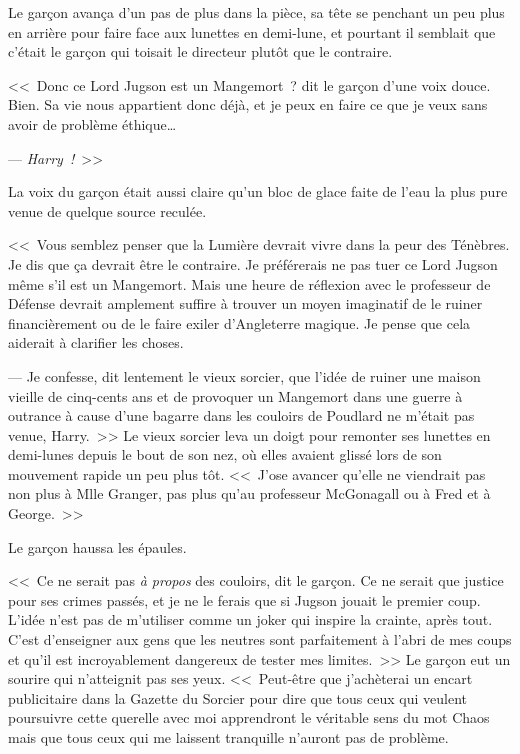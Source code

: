 Le garçon avança d'un pas de plus dans la pièce, sa tête se penchant un peu plus en arrière pour faire face aux lunettes en demi-lune, et pourtant il semblait que c'était le garçon qui toisait le directeur plutôt que le contraire.

<<~Donc ce Lord Jugson est un Mangemort~? dit le garçon d'une voix douce. Bien. Sa vie nous appartient donc déjà, et je peux en faire ce que je veux sans avoir de problème éthique…

--- \emph{Harry~!}~>>

La voix du garçon était aussi claire qu'un bloc de glace faite de l'eau la plus pure venue de quelque source reculée.

<<~Vous semblez penser que la Lumière devrait vivre dans la peur des Ténèbres. Je dis que ça devrait être le contraire. Je préférerais ne pas tuer ce Lord Jugson même s'il est un Mangemort. Mais une heure de réflexion avec le professeur de Défense devrait amplement suffire à trouver un moyen imaginatif de le ruiner financièrement ou de le faire exiler d'Angleterre magique. Je pense que cela aiderait à clarifier les choses.

--- Je confesse, dit lentement le vieux sorcier, que l'idée de ruiner une maison vieille de cinq-cents ans et de provoquer un Mangemort dans une guerre à outrance à cause d'une bagarre dans les couloirs de Poudlard ne m'était pas venue, Harry.~>> Le vieux sorcier leva un doigt pour remonter ses lunettes en demi-lunes depuis le bout de son nez, où elles avaient glissé lors de son mouvement rapide un peu plus tôt. <<~J'ose avancer qu'elle ne viendrait pas non plus à Mlle Granger, pas plus qu'au professeur McGonagall ou à Fred et à George.~>>

Le garçon haussa les épaules.

<<~Ce ne serait pas \emph{à propos} des couloirs, dit le garçon. Ce ne serait que justice pour ses crimes passés, et je ne le ferais que si Jugson jouait le premier coup. L'idée n'est pas de m'utiliser comme un joker qui inspire la crainte, après tout. C'est d'enseigner aux gens que les neutres sont parfaitement à l'abri de mes coups et qu'il est incroyablement dangereux de tester mes limites.~>> Le garçon eut un sourire qui n'atteignit pas ses yeux. <<~Peut-être que j'achèterai un encart publicitaire dans la Gazette du Sorcier pour dire que tous ceux qui veulent poursuivre cette querelle avec moi apprendront le véritable sens du mot Chaos mais que tous ceux qui me laissent tranquille n'auront pas de problème.

